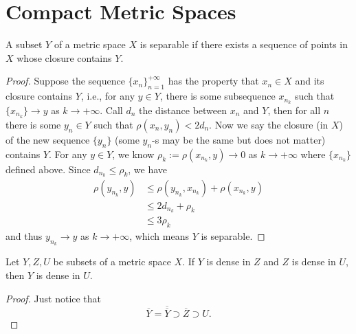 \section{Compact Metric Spaces}
\begin{pro}%
	A subset $Y$ of a metric space $X$ is separable if there exists a sequence of points in $X$ whose closure contains $Y$.
\end{pro}
\begin{proof}
	Suppose the sequence $\{x_n\}_{n=1}^{+\infty}$ has the property that $x_n\in X$ and its closure contains $Y$, i.e., for any $y\in Y$, there is some subsequence $x_{n_k}$ such that $\{x_{n_k}\}\to y$ as $k\to +\infty$. Call $d_n$ the distance between $x_n$ and $Y$, then for all $n$ there is some $y_n\in Y$ such that $\rho(x_n,y_n)<2d_n$. Now we say the closure (in $X$) of the new sequence $\{y_n\}$ (some $y_n$-s may be the same but does not matter) contains $Y$. For any $y\in Y$, we know $\rho_k:=\rho(x_{n_k},y)\to 0$ as $k\to +\infty$ where $\{x_{n_k}\}$ defined above. Since $d_{n_k}\leq \rho_k$, we have
	\begin{align*}
	\rho(y_{n_k},y)&\leq \rho(y_{n_k},x_{n_k})+\rho(x_{n_k},y)\\
				   &\leq 2d_{n_k}+\rho_k\\
				   &\leq 3\rho_k
	\end{align*}
	and thus $y_{n_k}\to y$ as $k\to +\infty$, which means $Y$ is separable.
\end{proof}

\begin{pro}%
	Let $Y,Z,U$ be subsets of a metric space $X$. If $Y$ is dense in $Z$ and $Z$ is dense in $U$, then $Y$ is dense in $U$.
\end{pro}
\begin{proof}
	Just notice that
	\[\overline{Y}=\overline{\overline{Y}}\supset \overline{Z}\supset U.\]
\end{proof}

